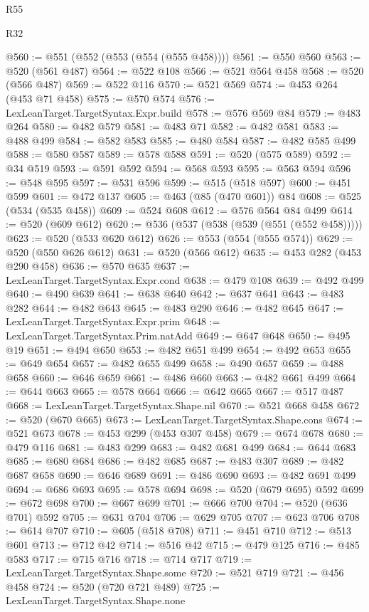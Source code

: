 \begin{lexlean}{R55}
\begin{lexlean}{R32}
\begin{coremodule}
{{{{{{{{{{{{{{{{{{{{{{{{{{{{{{{{{{{{{{{{{{{{{{{{{{{@560 := @551 (@552 (@553 (@554 (@555 @458))))
@561 := @550 @560
@563 := @520 (@561 @487)
@564 := @522 @108
@566 := @521 @564 @458
@568 := @520 (@566 @487)
@569 := @522 @116
@570 := @521 @569
@574 := @453 @264 (@453 @71 @458)
@575 := @570 @574
@576 := LexLeanTarget.TargetSyntax.Expr.build
@578 := @576 @569 @84
@579 := @483 @264
@580 := @482 @579
@581 := @483 @71
@582 := @482 @581
@583 := @488 @499
@584 := @582 @583
@585 := @480 @584
@587 := @482 @585 @499
@588 := @580 @587
@589 := @578 @588
@591 := @520 (@575 @589)
@592 := @34 @519
@593 := @591 @592
@594 := @568 @593
@595 := @563 @594
@596 := @548 @595
@597 := @531 @596
@599 := @515 (@518 @597)
@600 := @451 @599
@601 := @472 @137
@605 := @463 (@85 (@470 @601)) @84
@608 := @525 (@534 (@535 @458))
@609 := @524 @608
@612 := @576 @564 @84 @499
@614 := @520 (@609 @612)
@620 := @536 (@537 (@538 (@539 (@551 (@552 @458)))))
@623 := @520 (@533 @620 @612)
@626 := @553 (@554 (@555 @574))
@629 := @520 (@550 @626 @612)
@631 := @520 (@566 @612)
@635 := @453 @282 (@453 @290 @458)
@636 := @570 @635
@637 := LexLeanTarget.TargetSyntax.Expr.cond
@638 := @479 @108
@639 := @492 @499
@640 := @490 @639
@641 := @638 @640
@642 := @637 @641
@643 := @483 @282
@644 := @482 @643
@645 := @483 @290
@646 := @482 @645
@647 := LexLeanTarget.TargetSyntax.Expr.prim
@648 := LexLeanTarget.TargetSyntax.Prim.natAdd
@649 := @647 @648
@650 := @495 @19
@651 := @494 @650
@653 := @482 @651 @499
@654 := @492 @653
@655 := @649 @654
@657 := @482 @655 @499
@658 := @490 @657
@659 := @488 @658
@660 := @646 @659
@661 := @486 @660
@663 := @482 @661 @499
@664 := @644 @663
@665 := @578 @664
@666 := @642 @665
@667 := @517 @487
@668 := LexLeanTarget.TargetSyntax.Shape.nil
@670 := @521 @668 @458
@672 := @520 (@670 @665)
@673 := LexLeanTarget.TargetSyntax.Shape.cons
@674 := @521 @673
@678 := @453 @299 (@453 @307 @458)
@679 := @674 @678
@680 := @479 @116
@681 := @483 @299
@683 := @482 @681 @499
@684 := @644 @683
@685 := @680 @684
@686 := @482 @685
@687 := @483 @307
@689 := @482 @687 @658
@690 := @646 @689
@691 := @486 @690
@693 := @482 @691 @499
@694 := @686 @693
@695 := @578 @694
@698 := @520 (@679 @695) @592
@699 := @672 @698
@700 := @667 @699
@701 := @666 @700
@704 := @520 (@636 @701) @592
@705 := @631 @704
@706 := @629 @705
@707 := @623 @706
@708 := @614 @707
@710 := @605 (@518 @708)
@711 := @451 @710
@712 := @513 @601
@713 := @712 @42
@714 := @516 @42
@715 := @479 @125
@716 := @485 @583
@717 := @715 @716
@718 := @714 @717
@719 := LexLeanTarget.TargetSyntax.Shape.some
@720 := @521 @719
@721 := @456 @458
@724 := @520 (@720 @721 @489)
@725 := LexLeanTarget.TargetSyntax.Shape.none
}}}}}}}}}}}}}}}}}}}}}}}}}}}}}}}}}}}}}}}}}}}}}}}}}}}
\end{coremodule}
\end{lexlean}
\end{lexlean}
